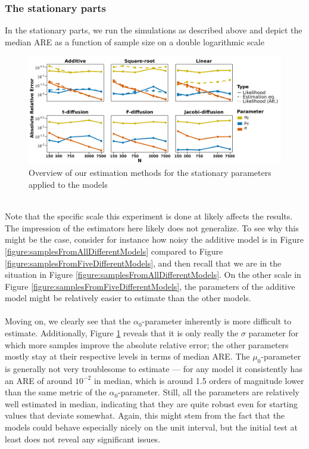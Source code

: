 \subsubsection{The stationary parts}
In the stationary parts, we run the simulations as described above and depict the median ARE as a function of sample size on a double logarithmic scale
\begin{figure}[h]
    \begin{center}
    \includegraphics[scale = .1]{figures/parameter_precision_stationary.jpeg}
    \caption{Overview of our estimation methods for the stationary parameters applied to the models}
    \label{figure:overviewOfEstimatorsStationary}
    \end{center}
\end{figure}\\
Note that the specific scale this experiment is done at likely affects the results. The impression of the estimators here likely does not generalize. To see why this might be the case, consider for instance how noisy the additive model is in Figure \ref{figure:samplesFromAllDifferentModels} compared to Figure \ref{figure:samplesFromFiveDifferentModels}, and then recall that we are in the situation in Figure \ref{figure:samplesFromAllDifferentModels}. On the other scale in Figure \ref{figure:samplesFromFiveDifferentModels}, the parameters of the additive model might be relatively easier to estimate than the other models.\\\\
Moving on, we clearly see that the $\alpha_0$-parameter inherently is more difficult to estimate. Additionally, Figure \ref{figure:overviewOfEstimatorsStationary} reveals that it is only really the $\sigma$ parameter for which more samples improve the absolute relative error; the other parameters mostly stay at their respective levels in terms of median ARE. The $\mu_0$-parameter is generally not very troublesome to estimate — for any model it consistently has an ARE of around $10^{-2}$ in median, which is around 1.5 orders of magnitude lower than the same metric of the $\alpha_0$-parameter. Still, all the parameters are relatively well estimated in median, indicating that they are quite robust even for starting values that deviate somewhat. Again, this might stem from the fact that the models could behave especially nicely on the unit interval, but the initial test at least does not reveal any significant issues.

